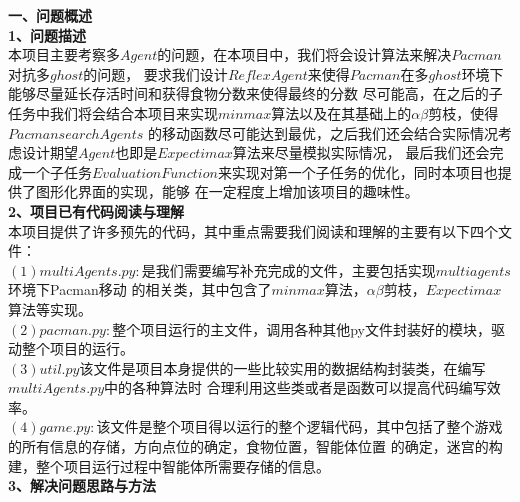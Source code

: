 \documentclass[a4paper,12pt,UTF8]{article}
\begin{document}
\begin{flushleft}
{
       \Large{
        \textbf{一、问题概述\\}
       }
       \large{
        \hspace{1cm}\textbf{1、问题描述\\}
       }
       \hspace{1cm}\normalsize{
            本项目主要考察多$Agent$的问题，在本项目中，我们将会设计算法来解决$Pacman$对抗多$ghost$的问题，
            要求我们设计$Reflex Agent$来使得$Pacman$在多$ghost$环境下能够尽量延长存活时间和获得食物分数来使得最终的分数
            尽可能高，在之后的子任务中我们将会结合本项目来实现$minmax$算法以及在其基础上的$\alpha  \beta$剪枝，使得$Pacman searchAgents$
            的移动函数尽可能达到最优，之后我们还会结合实际情况考虑设计期望$Agent$也即是$Expectimax$算法来尽量模拟实际情况，
            最后我们还会完成一个子任务$Evaluation Function$来实现对第一个子任务的优化，同时本项目也提供了图形化界面的实现，能够
            在一定程度上增加该项目的趣味性。\\
    }
    \large{
        \hspace{1cm}\textbf{2、项目已有代码阅读与理解\\}
    }
    \hspace{1cm}\normalsize{
        本项目提供了许多预先的代码，其中重点需要我们阅读和理解的主要有以下四个文件：\\
        \hspace{1cm}$(1)multiAgents.py:$是我们需要编写补充完成的文件，主要包括实现$multiagents$环境下Pacman移动
        的相关类，其中包含了$minmax$算法，$\alpha \beta$剪枝，$Expectimax$算法等实现。\\
        \hspace{1cm}$(2)pacman.py:$整个项目运行的主文件，调用各种其他py文件封装好的模块，驱动整个项目的运行。\\
        \hspace{1cm}$(3)util.py$该文件是项目本身提供的一些比较实用的数据结构封装类，在编写$multiAgents.py$中的各种算法时
        合理利用这些类或者是函数可以提高代码编写效率。\\
        \hspace{1cm}$(4)game.py:$该文件是整个项目得以运行的整个逻辑代码，其中包括了整个游戏的所有信息的存储，方向点位的确定，食物位置，智能体位置
        的确定，迷宫的构建，整个项目运行过程中智能体所需要存储的信息。\\     
    }
    \large{
        \hspace{1cm}\textbf{3、解决问题思路与方法\\}
}}
\end{flushleft}
\end{document}

